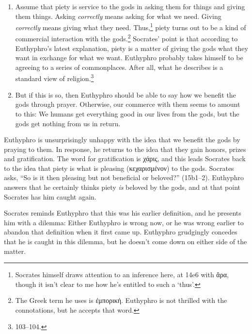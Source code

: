 \documentclass[11pt]{article}
\begin{document}
\begin{enumerate}

    \item Assume that piety is service to the gods in asking them for
        things and giving them things.  Asking \emph{correctly} means
        asking for what we need.  Giving \emph{correctly} means giving what
        they need.  Thus,\footnote{Socrates himself draws attention to an
        inference here, at 14e6 with {\g ἄρα}, though it isn't clear to
        me how he's entitled to such a `thus'.} piety turns out to be
        a kind of commercial interaction with the gods.\footnote{The Greek
        term he uses is {\g ἐμπορική}.  Euthyphro is not thrilled with
        the connotations, but he accepts that word.}  Socrates' point is
        that according to Euthyphro's latest explanation, piety is a matter
        of giving the gods what they want in exchange for what we want.
        Euthyphro probably takes himself to be agreeing to a series of
        commonplaces.  After all, what he describes is a standard
         view of religion.\footnote{\citet{bailly2003}
        103--104.}

    \item But if this is so, then Euthyphro should be able to say how we
        benefit the gods through prayer.  Otherwise, our commerce with them
        seems to amount to this: We humans get everything good in our lives
        from the gods, but the gods get nothing from us in return.

\end{enumerate}

Euthyphro is unsurprisingly unhappy with the idea that we benefit the gods
by praying to them.  In response, he returns to the idea that they gain
honors, prizes and gratification.  The word for gratification is {\g
χάρις}, and this leads Socrates back to the idea that piety is what is
pleasing ({\g κεχαρισμένον}) to the gods.  Socrates asks, ``So is it then
pleasing but not beneficial or beloved?'' (15b1--2).  Euthyphro answers that
he certainly thinks piety \emph{is} beloved by the gods, and at that point
Socrates has him caught again.

Socrates reminds Euthyphro that this was his earlier definition, and he
presents him with a dilemma: Either Euthyphro is wrong now, or he was wrong
earlier to abandon that definition when it first came up.  Euthyphro
grudgingly concedes that he is caught in this dilemma, but he doesn't come
down on either side of the matter.
\end{document}
